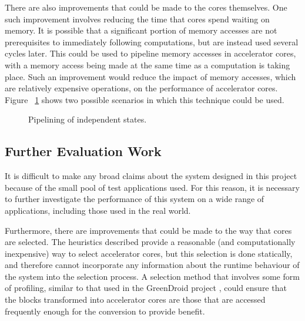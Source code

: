 \documentclass{UoYCSproject}
\begin{document}
There are also improvements that could be made to the cores themselves. One such improvement involves reducing the time
that cores spend waiting on memory. It is possible that a significant portion of memory accesses are not prerequisites to
immediately following computations, but are instead used several cycles later. This could be used to pipeline memory accesses
in accelerator cores, with a memory access being made at the same time as a computation is taking place. Such an improvement
would reduce the impact of memory accesses, which are relatively expensive operations, on the performance of accelerator cores.
Figure ~\ref{fig:pipeliningAccelerators} shows two possible scenarios in which this technique could be used.

\begin{figure}[H]
\caption{Pipelining of independent states.}
\label{fig:pipeliningAccelerators}
\end{figure}

\subsection{Further Evaluation Work}

It is difficult to make any broad claims about the system designed in this project because of the small pool of test
applications used. For this reason, it is necessary to further investigate the performance of this system on a wide range of
applications, including those used in the real world.

Furthermore, there are improvements that could be made to the way that cores are selected. The heuristics described provide
a reasonable (and computationally inexpensive) way to select accelerator cores, but this selection is done statically, and
therefore cannot incorporate any information about the runtime behaviour of the system into the selection process.
A selection method that involves some form of profiling, similar to that used in the GreenDroid project \cite{greendroid},
could ensure that the blocks transformed into accelerator cores are those that are accessed frequently enough
for the conversion to provide benefit.
\end{document}
